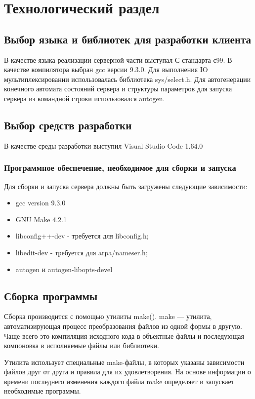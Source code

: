 \documentclass[a4paper,12pt]{report}
\begin{document}
\chapter{Технологический раздел}

\section{Выбор языка и библиотек для разработки клиента}
В качестве языка реализации серверной части выступал С стандарта с99. В качестве компилятора выбран gcc версии 9.3.0. Для выполнения IO мультиплексировании использовалась библиотека sys/select.h. Для автогенерации конечного автомата состояний сервера и структуры параметров для запуска сервера из командной строки использовался autogen.

\section{Выбор средств разработки}
В качестве среды разработки выступил Visual Studio Code 1.64.0

\subsection{Программное обеспечение, необходимое для сборки и запуска}
Для сборки и запуска сервера должны быть загружены следующие зависимости:

\begin{itemize} 
    \item gcc version 9.3.0
    \item GNU Make 4.2.1
    \item libconfig++-dev - требуется для libconfig.h;
    \item libedit-dev - требуется для arpa/nameser.h;
    \item autogen и autogen-libopts-devel
\end{itemize} 

\section{Сборка программы}

Сборка производится с помощью утилиты make(\cite{make}). make — утилита, автоматизирующая процесс преобразования файлов из одной формы в другую. Чаще всего это компиляция исходного кода в объектные файлы и последующая компоновка в исполняемые файлы или библиотеки.

Утилита использует специальные make-файлы, в которых указаны зависимости файлов друг от друга и правила для их удовлетворения. На основе информации о времени последнего изменения каждого файла make определяет и запускает необходимые программы.
\end{document}
